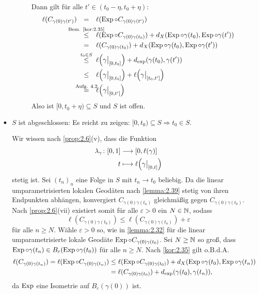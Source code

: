 \begin{beweis}
\begin{itemize}
\begin{description}
			Dann gilt für alle $t' \in (t_0 - \eta, t_0 + \eta)$:
			\begin{align*}
				\ell(C_{\gamma(0)\gamma(t')}) &\stack{}{=} \ell(\Exp \circ C_{\gamma(0)\gamma(t')}) \\
				&\stack{\text{Bem. \ref{kor:2.35}}}{\leq} \ell(\Exp \circ C_{\gamma(0)\gamma(t_0)}) + d_X(\Exp \circ \gamma(t_0),\Exp \circ \gamma(t')) \\
				&\stack{}{=} \ell(C_{\gamma(0)\gamma(t_0)}) + d_X(\Exp \circ \gamma(t_0),\Exp \circ \gamma(t')) \\
				&\stack{t_0 \in S}{\leq} \ell\enbrace*{\gamma \big|_{[0,t_0]}} + d_{\exp}(\gamma(t_0),\gamma(t')) \\
				&\stack{}{\leq} \ell\enbrace*{\gamma \big|_{[0,t_0]}} + \ell\enbrace*{\gamma \big|_{[t_0,t']}} \\
				&\stack{\text{Aufg. 4.2}}{=} \ell\enbrace*{\gamma \big|_{[0,t']}}
			\end{align*}
			Also ist $[0,t_0 + \eta) \subseteq S$ und $S$ ist offen.
		\end{description}
		\item $S$ ist abgeschlossen:
		Es reicht zu zeigen: $[0,t_0) \subseteq S \Rightarrow t_0 \in S$.
		
		Wir wissen nach \autoref{prop:2.6}(v), dass die Funktion
		\begin{align}
			\lambda_\gamma\colon [0,1] &\longrightarrow [0,\ell(\gamma)] \label{eq:2.40.1}\\
			t &\longmapsto \ell\enbrace*{\gamma \big|_{[0,t]}}
		\end{align}
		stetig ist.
		Sei $(t_n)_n$ eine Folge in $S$ mit $t_n \rightarrow t_0$ beliebig.
		Da die linear umparametrisierten lokalen Geodäten nach \autoref{lemma:2.39} stetig von ihren Endpunkten abhängen, konvergiert $C_{\gamma(0)\gamma(t_n)}$ gleichmäßig gegen $C_{\gamma(0)\gamma(t_0)}$.
		Nach \autoref{prop:2.6}(vii) existiert somit für alle $\varepsilon > 0$ ein $N \in \mathbb{N}$, sodass
		\begin{equation}
			\ell(C_{\gamma(0)\gamma(t_0)}) \leq \ell(C_{\gamma(0)\gamma(t_n)}) + \varepsilon \label{eq:2.40.2}
		\end{equation}
		für alle $n \geq N$.
		Wähle $\varepsilon > 0$ so, wie in \autoref{lemma:2.32} für die linear umparametrisierte lokale Geodäte $\operatorname{Exp} \circ C_{\gamma(0)\gamma(t_0)}$.
		Sei $N \geq \mathbb{N}$ so groß, dass $\operatorname{Exp} \circ \gamma(t_n) \in B_\varepsilon(\operatorname{Exp} \circ \gamma(t_0))$ für alle $n \geq N$.
		Nach \autoref{kor:2.35} gilt o.B.d.A.
		\begin{align}
			\ell(C_{\gamma(0)\gamma(t_n)}) = \ell(\operatorname{Exp} \circ C_{\gamma(0)\gamma(t_n)}) &\leq \ell(\operatorname{Exp} \circ C_{\gamma(0)\gamma(t_0)}) + d_X(\operatorname{Exp} \circ \gamma(t_0),\operatorname{Exp} \circ \gamma(t_n)) \\
			&= \ell(C_{\gamma(0)\gamma(t_0)}) + d_{\exp}(\gamma(t_0),\gamma(t_n)), \label{eq:2.40.3}
		\end{align}
		da $\operatorname{Exp}$ eine Isometrie auf $B_\varepsilon(\gamma(0))$ ist.
		

\end{itemize}
\end{beweis}
